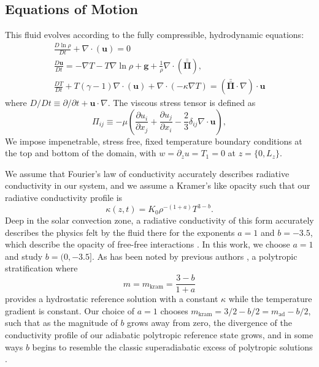 \documentclass[twocolumn, amsmath, amsfonts, amssymb]{aastex62}
\newcommand{\Div}[1]{\ensuremath{\nabla\cdot\left( #1\right)}}
\newcommand{\grad}{\ensuremath{\nabla}}
\newcommand{\stressT}{\ensuremath{\bm{\bar{\bar{\Pi}}}}}
\begin{document}
\subsection{Equations of Motion}
This fluid evolves according to the fully
compressible, hydrodynamic equations:
\begin{gather}
\frac{D \ln\rho}{D t} + \Div{\bm{u}} = 0
	\label{eqn:density_equation}
\\
\frac{D \bm{u}}{D t}  =
-\grad T - T \grad\ln\rho + \bm{g} + \frac{1}{\rho}\Div{\stressT}, 
	\label{eqn:momentum_equation}
\\
\frac{D T}{D t} + T(\gamma - 1)\Div{\bm{u}}
+ \Div{-\kappa \grad T} = (\stressT\cdot\grad)\cdot\bm{u}
	\label{eqn:energy_equation}
\end{gather}
where $D/Dt \equiv \partial/\partial t + \bm{u}\cdot\grad$. The
viscous stress tensor is defined as 
\begin{equation}
\Pi_{ij} \equiv -\mu \left(\frac{\partial u_i}{\partial x_j} + 
\frac{\partial u_j}{\partial x_i} - \frac{2}{3}\delta_{ij}\grad\cdot\bm{u}\right),
	\label{eqn:stress_tensor}
\end{equation}
We impose impenetrable, stress free, fixed temperature boundary conditions at
the top and bottom of the domain, with 
$w = \partial_z u = T_1 = 0$ at $z = \{0, L_z\}$. 


We assume that Fourier's law of conductivity \citep{lecoanet&all2014} accurately
describes radiative conductivity in our system, and we assume a Kramer's like
opacity such that our radiative conductivity profile is 
\citep{barekat&brandenburg2014, kapyla&all2017, kapyla&all2018}
\begin{equation}
\kappa(z, t) = K_0 \rho^{-(1+a)}T^{3-b}.
\end{equation}
Deep in the solar convection zone, a radiative conductivity of this form accurately
describes the physics felt by the fluid there for the exponents $a = 1$ and
$b = -3.5$, which describe the opacity of free-free interactions 
\citep{Cox&Giuli}. In this work, we choose $a = 1$ and study $b = (0, -3.5]$.
As has been noted by previous authors \citep{jones1976, edwards1990, barekat&brandenburg2014},
a polytropic stratification where
$$
m = m_{\text{kram}} = \frac{3-b}{1 + a}
$$
provides a hydrostatic reference solution with a constant $\kappa$ while the
temperature gradient is constant. Our choice of $a = 1$ chooses
$m_{\text{kram}} = 3/2 - b/2  = m_{\text{ad}} - b/2$, such that as the magnitude
of $b$ grows away from zero, the divergence of the 
conductivity profile of our adiabatic polytropic reference state grows, and in
some ways $b$ begins to resemble the classic superadiabatic excess of polytropic
solutions \citep{graham1975, anders&brown2017}.
\end{document}
